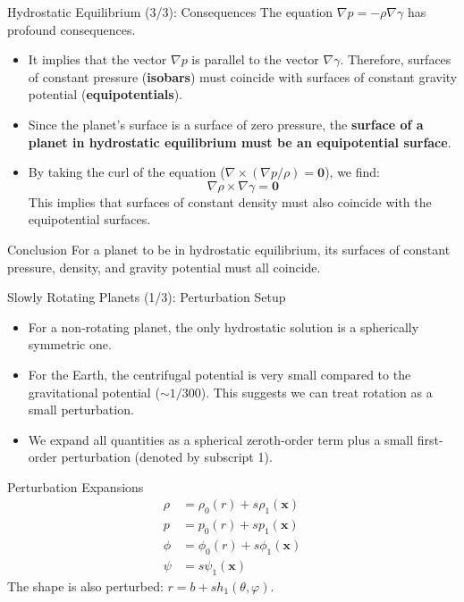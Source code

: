 \documentclass{beamer}
\begin{document}
\begin{frame}{Hydrostatic Equilibrium (3/3): Consequences}
    The equation $\nabla p = -\rho \nabla\gamma$ has profound consequences.
    \begin{itemize}
        \item It implies that the vector $\nabla p$ is parallel to the vector $\nabla\gamma$. Therefore, surfaces of constant pressure (\textbf{isobars}) must coincide with surfaces of constant gravity potential (\textbf{equipotentials}).
        \pause
        \item Since the planet's surface is a surface of zero pressure, the \textbf{surface of a planet in hydrostatic equilibrium must be an equipotential surface}.
        \pause
        \item By taking the curl of the equation ($\nabla \times (\nabla p / \rho) = \mathbf{0}$), we find:
        $$ \nabla\rho \times \nabla\gamma = \mathbf{0} $$
        This implies that surfaces of constant density must also coincide with the equipotential surfaces.
    \end{itemize}
    \begin{alertblock}{Conclusion}
        For a planet to be in hydrostatic equilibrium, its surfaces of constant pressure, density, and gravity potential must all coincide.
    \end{alertblock}
\end{frame}


\begin{frame}{Slowly Rotating Planets (1/3): Perturbation Setup}
    \begin{itemize}
        \item For a non-rotating planet, the only hydrostatic solution is a spherically symmetric one.
        \pause
        \item For the Earth, the centrifugal potential is very small compared to the gravitational potential ($\sim 1/300$). This suggests we can treat rotation as a small perturbation.
        \pause
        \item We expand all quantities as a spherical zeroth-order term plus a small first-order perturbation (denoted by subscript 1).
    \end{itemize}
    \begin{block}{Perturbation Expansions}
        \begin{align*}
            \rho &= \rho_0(r) + s\rho_1(\mathbf{x}) \\
            p &= p_0(r) + sp_1(\mathbf{x}) \\
            \phi &= \phi_0(r) + s\phi_1(\mathbf{x}) \\
            \psi &= s\psi_1(\mathbf{x})
        \end{align*}
        The shape is also perturbed: $r = b + s h_1(\theta, \varphi)$.
    \end{block}
\end{frame}
\end{document}
